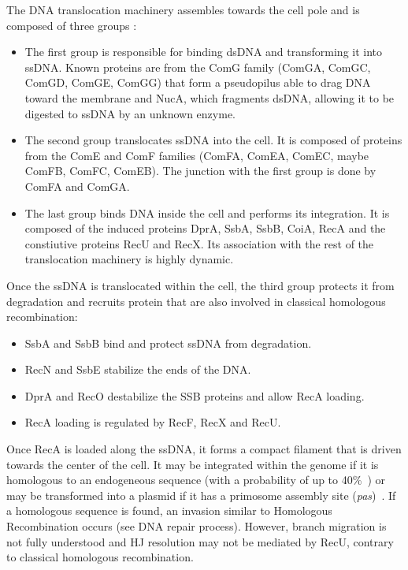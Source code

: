 The DNA translocation machinery assembles towards the cell pole and is composed of three groups \citep{kidane_cell_2012}:
\begin{itemize}
	\item The first group is responsible for binding dsDNA and transforming it into ssDNA. Known proteins are from the ComG family (ComGA, ComGC, ComGD, ComGE, ComGG) that form a pseudopilus able to drag DNA toward the membrane and NucA, which fragments dsDNA, allowing it to be digested to ssDNA by an unknown enzyme.
	\item The second group translocates ssDNA into the cell. It is composed of proteins from the ComE and ComF families (ComFA, ComEA, ComEC, maybe ComFB, ComFC, ComEB). The junction with the first group is done by ComFA and ComGA.
	\item The last group binds DNA inside the cell and performs its integration. It is composed of the induced proteins DprA, SsbA, SsbB, CoiA, RecA and the constiutive proteins RecU and RecX. Its association with the rest of the translocation machinery is highly dynamic.
\end{itemize}
Once the ssDNA is translocated within the cell, the third group protects it from degradation and recruits protein that are also involved in classical homologous recombination:
\begin{itemize}
	\item SsbA and SsbB bind and protect ssDNA from degradation.
	\item RecN and SsbE stabilize the ends of the DNA.
	\item DprA and RecO destabilize the SSB proteins and allow RecA loading.
	\item RecA loading is regulated by RecF, RecX and RecU.
\end{itemize}
Once RecA is loaded along the ssDNA, it forms a compact filament that is driven towards the center of the cell. It may be integrated within the genome if it is homologous to an endogeneous sequence (with a probability of up to 40\%~\citep{kidane_cell_2012}) or may be transformed into a plasmid if it has a primosome assembly site (\textit{pas})~\citep{kidane_cell_2012}. If a homologous sequence is found, an invasion similar to Homologous Recombination occurs (see DNA repair process). However, branch migration is not fully understood and HJ resolution may not be mediated by RecU, contrary to classical homologous recombination.


